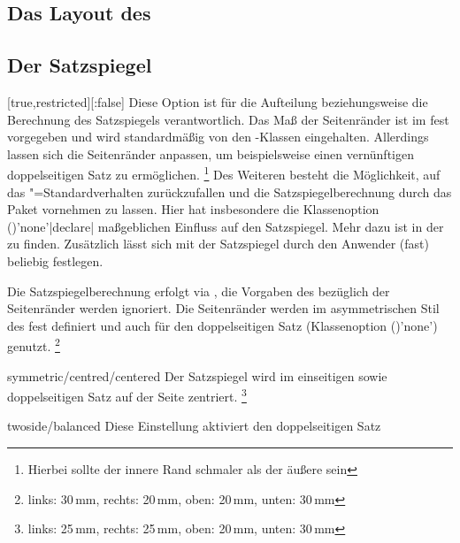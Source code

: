 \begin{Declaration*}{}
\begin{Declaration*}{}
\begin{Declaration*}{}
\section{Das Layout des \CDs}
%
\subsection{Der Satzspiegel}
%
%
\begin{Declaration}[%
  v2.03;
  v2.05!\Option{cdgeometry=restricted};%
  v2.05!\Option{cdgeometry=adapted};%
  v2.05!\Option{cdgeometry=calculated};%
  v2.05!\Option{cdgeometry=custom};%
]{}[true,restricted][:false]%
\printdeclarationlist%
%
%
%
Diese Option ist für die Aufteilung beziehungsweise die Berechnung des 
Satzspiegels verantwortlich. Das Maß der Seitenränder ist im \CD fest 
vorgegeben und wird standardmäßig von den \TUDScript-Klassen eingehalten. 
Allerdings lassen sich die Seitenränder anpassen, um beispielsweise einen 
vernünftigen doppelseitigen Satz zu ermöglichen.%
\footnote{Hierbei sollte der innere Rand schmaler als der äußere sein}
Des Weiteren besteht die Möglichkeit, auf das \KOMAScript"=Standardverhalten 
zurückzufallen und die Satzspiegelberechnung durch das Paket  
vornehmen zu lassen. Hier hat insbesondere die Klassenoption 
()'none'|declare| maßgeblichen Einfluss auf 
den Satzspiegel. Mehr dazu ist in der  
zu finden.
Zusätzlich lässt sich mit  der Satzspiegel durch den 
Anwender (fast) beliebig festlegen.
%
\begin{values}{}
\itemfalse
  Die Satzspiegelberechnung erfolgt via , die Vorgaben des 
  \CDs bezüglich der Seitenränder werden ignoriert.
\itemtrue*[asymmetric/cd]
  Die Seitenränder werden im asymmetrischen Stil des \CDs fest definiert und 
  auch für den doppelseitigen Satz
  (Klassenoption ()'none') genutzt.%
  \footnote{links: 30\,mm, rechts: 20\,mm, oben: 20\,mm, unten: 30\,mm}
\item[symmetric/centred/centered]
  Der Satzspiegel wird im einseitigen sowie doppelseitigen Satz auf der Seite 
  zentriert.%
  \footnote{links: 25\,mm, rechts: 25\,mm, oben: 20\,mm, unten: 30\,mm}
\item[twoside/balanced]
  Diese Einstellung aktiviert den doppelseitigen Satz 

\end{values}
\end{Declaration}
\end{Declaration*}
\end{Declaration*}
\end{Declaration*}
